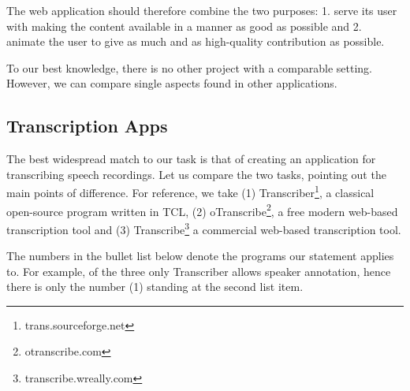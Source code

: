 \documentclass{svproc}
\begin{document}
The web application should therefore combine the two purposes: 1. serve its user
with making the content available in a manner as good as possible and 2. animate
the user to give as much and as high-quality contribution as possible.

To our best knowledge, there is no other project with a comparable setting.
However, we can compare single aspects found in other applications.

\subsection{Transcription Apps}
\label{ssec:diff:trans}

The best widespread match to our task is that of creating an application for
transcribing speech recordings. Let us compare the two tasks, pointing out the
main points of difference. For reference, we take (1)
Transcriber\footnote{trans.sourceforge.net}, a classical open-source program
written in TCL, (2) oTranscribe\footnote{otranscribe.com}, a free modern
web-based transcription tool and (3) Transcribe\footnote{transcribe.wreally.com}
a commercial web-based transcription tool.

The numbers in the bullet list below denote the programs our statement applies
to. For example, of the three only Transcriber allows speaker annotation, hence
there is only the number (1) standing at the second list item.
\end{document}

